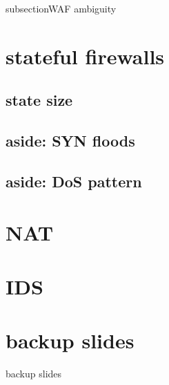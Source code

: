 \date{}
\title{}
\date{}

\begin{frame}
    \titlepage
\end{frame}

subsection{WAF ambiguity}


\section{stateful firewalls}


\subsection{state size}


\subsection{aside: SYN floods}


\subsection{aside: DoS pattern}


\section{NAT}


\section{IDS}





\section{backup slides}
\begin{frame}{backup slides}
\end{frame}


